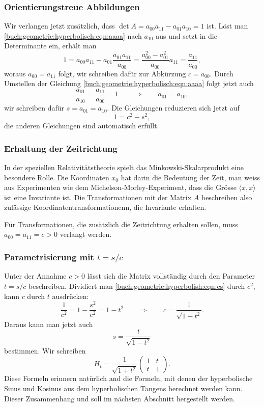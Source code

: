 \subsubsection{Orientierungstreue Abbildungen}
Wir verlangen jetzt zusätzlich, dass $\det A= a_{00}a_{11}-a_{01}{a_{10}} = 1$
ist.
Löst man \eqref{buch:geometrie:hyperbolisch:eqn:aaaa} nach $a_{10}$ aus
und setzt in die Determinante ein, erhält man
\[
1
=
a_{00}a_{11} - a_{01} \frac{a_{01}a_{11}}{a_{00}} 
=
\frac{ a_{00}^2-a_{01}^2}{a_{00}} a_{11} 
=
\frac{a_{11}}{a_{00}},
\]
woraus $a_{00}=a_{11}$ folgt, wir schreiben dafür zur Abkürzung $c=a_{00}$.
Durch Umstellen der Gleichung \eqref{buch:geometrie:hyperbolisch:eqn:aaaa}
folgt jetzt auch
\[
\frac{a_{01}}{a_{10}} = \frac{a_{11}}{a_{00}} = 1
\qquad\Rightarrow\qquad
a_{01}=a_{10},
\]
wir schreiben dafür $s=a_{01}=a_{10}$.
Die Gleichungen reduzieren sich jetzt auf
\begin{equation}
1= c^2-s^2,
\label{buch:geometrie:hyperbolish:eqn:cs}
\end{equation}
die anderen Gleichungen sind automatisch erfüllt.

\subsubsection{Erhaltung der Zeitrichtung}
In der speziellen Relativitätstheorie spielt das Minkowski-Skalarprodukt
eine besondere Rolle.
Die Koordinaten $x_0$ hat darin die Bedeutung der Zeit,
man weiss aus Experimenten wie dem Michelson-Morley-Experiment,
dass die Grösse $\langle x,x\rangle$ ist eine Invariante ist.
Die Transformationen mit der Matrix $A$ beschreiben also zulässige
Koordinatentransformationenn, die Invariante erhalten.

Für Transformationen, die zusätzlich die Zeitrichtung erhalten sollen,
muss $a_{00}=a_{11}=c>0$ verlangt werden.

\subsubsection{Parametrisierung mit $t=s/c$}
Unter der Annahme $c>0$ lässt sich die Matrix vollständig
durch den Parameter $t=s/c$ beschreiben.
Dividiert man \eqref{buch:geometrie:hyperbolish:eqn:cs} durch $c^2$,
kann $c$ durch $t$ ausdrücken:
\[
\frac{1}{c^2}
=
 1-\frac{s^2}{c^2}
=
1-t^2
\qquad\Rightarrow\qquad
c = \frac{1}{\sqrt{1-t^2}}.
\]
Daraus kann man jetzt auch 
\[
s=\frac{t}{\sqrt{1-t^2}}
\]
bestimmen.
Wir schreiben
\[
H_t
=
\frac{1}{\sqrt{1+t^2}}
\begin{pmatrix}
1&t\\
t&1
\end{pmatrix}.
\]
Diese Formeln erinnern natürlich and die Formeln, mit denen
der hyperbolische Sinus und Kosinus aus dem hyperbolischen
Tangens berechnet werden kann.
Dieser Zusammenhang und soll im nächsten Abschnitt hergestellt
werden.

